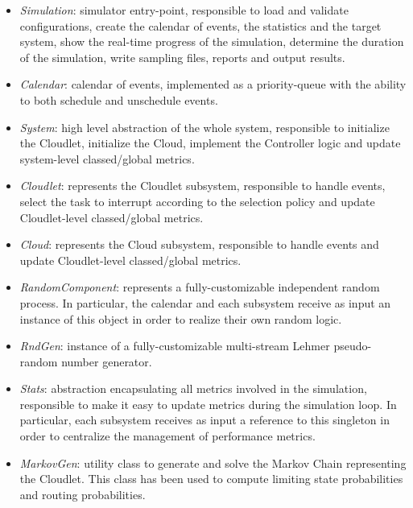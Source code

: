 \begin{itemize}

	\item \textit{Simulation}: simulator entry-point, responsible to load and validate configurations, create the calendar of events, the statistics and the target system, show the real-time progress of the simulation, determine the duration of the simulation, write sampling files, reports and output results.
	
	\item \textit{Calendar}: calendar of events, implemented as a priority-queue with the ability to both schedule and unschedule events.
	
	\item \textit{System}: high level abstraction of the whole system, responsible to initialize the Cloudlet, initialize the Cloud, implement the Controller logic and update system-level classed/global metrics.
	
	\item \textit{Cloudlet}: represents the Cloudlet subsystem, responsible to handle events, select the task to interrupt according to the selection policy and update Cloudlet-level classed/global metrics.
	
	\item \textit{Cloud}: represents the Cloud subsystem, responsible to handle events and update Cloudlet-level classed/global metrics.
	
	\item \textit{RandomComponent}: represents a fully-customizable independent random process. In particular, the calendar and each subsystem receive as input an instance of this object in order to realize their own random logic.
	
	\item \textit{RndGen}: instance of a fully-customizable multi-stream Lehmer pseudo-random number generator.
	
	\item \textit{Stats}: abstraction encapsulating all metrics involved in the simulation, responsible to make it easy to update metrics during the simulation loop. In particular, each subsystem receives as input a reference to this singleton in order to centralize the management of performance metrics.
	
	\item \textit{MarkovGen}: utility class to generate and solve the Markov Chain representing the Cloudlet. This class has been used to compute limiting state probabilities and routing probabilities.
\end{itemize}


